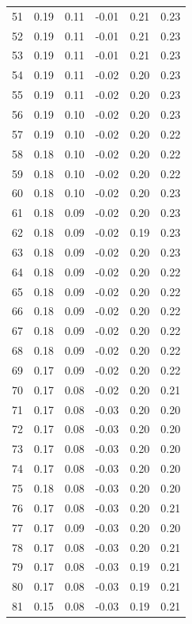 \documentclass[a4paper, 12pt]{article}
\begin{document}
\begin{tabularx}{\linewidth}{|X|X|X|X|X|X|}
    51 & 0.19 & 0.11 & -0.01 & 0.21 & 0.23 \\
    52 & 0.19 & 0.11 & -0.01 & 0.21 & 0.23 \\
    53 & 0.19 & 0.11 & -0.01 & 0.21 & 0.23 \\
    54 & 0.19 & 0.11 & -0.02 & 0.20 & 0.23 \\
    55 & 0.19 & 0.11 & -0.02 & 0.20 & 0.23 \\
    56 & 0.19 & 0.10 & -0.02 & 0.20 & 0.23 \\
    57 & 0.19 & 0.10 & -0.02 & 0.20 & 0.22 \\
    58 & 0.18 & 0.10 & -0.02 & 0.20 & 0.22 \\
    59 & 0.18 & 0.10 & -0.02 & 0.20 & 0.22 \\
    60 & 0.18 & 0.10 & -0.02 & 0.20 & 0.23 \\
    61 & 0.18 & 0.09 & -0.02 & 0.20 & 0.23 \\
    62 & 0.18 & 0.09 & -0.02 & 0.19 & 0.23 \\
    63 & 0.18 & 0.09 & -0.02 & 0.20 & 0.23 \\
    64 & 0.18 & 0.09 & -0.02 & 0.20 & 0.22 \\
    65 & 0.18 & 0.09 & -0.02 & 0.20 & 0.22 \\
    66 & 0.18 & 0.09 & -0.02 & 0.20 & 0.22 \\
    67 & 0.18 & 0.09 & -0.02 & 0.20 & 0.22 \\
    68 & 0.18 & 0.09 & -0.02 & 0.20 & 0.22 \\
    69 & 0.17 & 0.09 & -0.02 & 0.20 & 0.22 \\
    70 & 0.17 & 0.08 & -0.02 & 0.20 & 0.21 \\
    71 & 0.17 & 0.08 & -0.03 & 0.20 & 0.20 \\
    72 & 0.17 & 0.08 & -0.03 & 0.20 & 0.20 \\
    73 & 0.17 & 0.08 & -0.03 & 0.20 & 0.20 \\
    74 & 0.17 & 0.08 & -0.03 & 0.20 & 0.20 \\
    75 & 0.18 & 0.08 & -0.03 & 0.20 & 0.20 \\
    76 & 0.17 & 0.08 & -0.03 & 0.20 & 0.21 \\
    77 & 0.17 & 0.09 & -0.03 & 0.20 & 0.20 \\
    78 & 0.17 & 0.08 & -0.03 & 0.20 & 0.21 \\
    79 & 0.17 & 0.08 & -0.03 & 0.19 & 0.21 \\
    80 & 0.17 & 0.08 & -0.03 & 0.19 & 0.21 \\
    81 & 0.15 & 0.08 & -0.03 & 0.19 & 0.21 \\

\end{tabularx}
\end{document}
